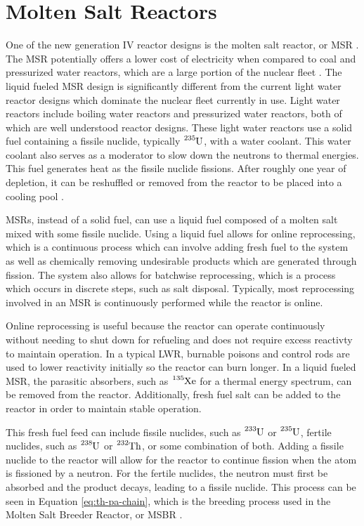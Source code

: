 \section{Molten Salt Reactors}

One of the new generation IV reactor designs is the molten salt reactor, or MSR \cite{kelly_generation_2014}. The MSR potentially offers a lower cost of electricity when compared to coal and pressurized water reactors, which are a large portion of the nuclear fleet \cite{moir_cost_2002}. The liquid fueled MSR design is significantly different from the current light water reactor designs which dominate the nuclear fleet currently in use. Light water reactors include boiling water reactors and pressurized water reactors, both of which are well understood reactor designs.
These light water reactors use a solid fuel containing a fissile nuclide, typically $\ce{^{235}U}$, with a water coolant. This water coolant also serves as a moderator to slow down the neutrons to thermal energies. This fuel generates heat as the fissile nuclide fissions.
After roughly one year of depletion, it can be reshuffled or removed from the reactor to be placed into a cooling pool \cite{kowalski_scheduling_1977}.

MSRs, instead of a solid fuel, can use a liquid fuel composed of a molten salt mixed with some fissile nuclide. Using a liquid fuel allows for online reprocessing, which is a continuous process which can involve adding fresh fuel to the system as well as chemically removing undesirable products which are generated through fission. The system also allows for batchwise reprocessing, which is a process which occurs in discrete steps, such as salt disposal. Typically, most reprocessing involved in an MSR is continuously performed while the reactor is online.

Online reprocessing is useful because the reactor can operate continuously without needing to shut down for refueling and does not require excess reactivty to maintain operation.
In a typical LWR, burnable poisons and control rods are used to lower reactivity initially so the reactor can burn longer. In a liquid fueled MSR, the parasitic absorbers, such as $\ce{^{135}Xe}$ for a thermal energy spectrum, can be removed from the reactor. Additionally, fresh fuel salt can be added to the reactor in order to maintain stable operation.

This fresh fuel feed can include fissile nuclides, such as $\ce{^{233}U}$ or $\ce{^{235}U}$, fertile nuclides, such as $\ce{^{238}U}$ or $\ce{^{232}Th}$, or some combination of both. Adding a fissile nuclide to the reactor will allow for the reactor to continue fission when the atom is fissioned by a neutron. For the fertile nuclides, the neutron must first be absorbed and the product decays, leading to a fissile nuclide. This process can be seen in Equation \eqref{eq:th-pa-chain}, which is the breeding process used in the Molten Salt Breeder Reactor, or MSBR \cite{robertson_conceptual_1971}.

